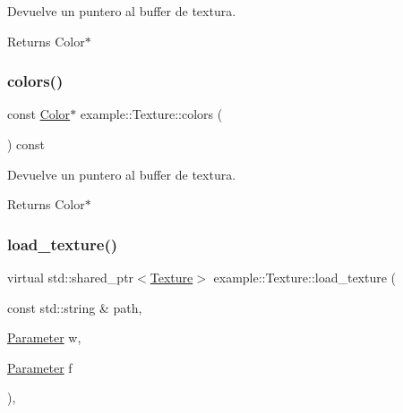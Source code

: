 Devuelve un puntero al buffer de textura. 

\begin{DoxyReturn}{Returns}
Color$\ast$ 
\end{DoxyReturn}
\mbox{\label{classexample_1_1_texture_adc2795254d224cfca3d4056d5bc4b963}} 
\subsubsection{\texorpdfstring{colors()}{colors()}\hspace{0.1cm}{\footnotesize\ttfamily [2/2]}}
{\footnotesize\ttfamily const \mbox{\hyperlink{classexample_1_1_color___r_g_b_a8888}{Color}}$\ast$ example\+::\+Texture\+::colors (\begin{DoxyParamCaption}{ }\end{DoxyParamCaption}) const\hspace{0.3cm}{\ttfamily [inline]}}



Devuelve un puntero al buffer de textura. 

\begin{DoxyReturn}{Returns}
Color$\ast$ 
\end{DoxyReturn}
\mbox{\label{classexample_1_1_texture_abc652f37394b62296b76d933feb9cbdc}} 
\subsubsection{\texorpdfstring{load\_texture()}{load\_texture()}}
{\footnotesize\ttfamily virtual std\+::shared\+\_\+ptr$<$\mbox{\hyperlink{classexample_1_1_texture}{Texture}}$>$ example\+::\+Texture\+::load\+\_\+texture (\begin{DoxyParamCaption}\item[{const std\+::string \&}]{path,  }\item[{\mbox{\hyperlink{classexample_1_1_texture_a4f7233e69c4a5b913dbe53d729c1765f}{Parameter}}}]{w,  }\item[{\mbox{\hyperlink{classexample_1_1_texture_a4f7233e69c4a5b913dbe53d729c1765f}{Parameter}}}]{f }\end{DoxyParamCaption})\hspace{0.3cm}{\ttfamily [inline]}, {\ttfamily [virtual]}}



